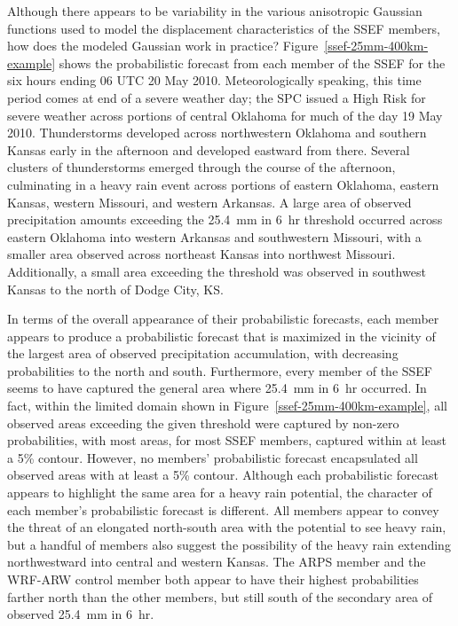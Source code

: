 Although there appears to be variability in the various anisotropic Gaussian functions used to model the displacement characteristics of the SSEF members, how does the modeled Gaussian work in practice?
\mbox{Figure \ref{ssef-25mm-400km-example}} shows the probabilistic forecast from each member of the SSEF for the six hours ending 06 UTC 20 May 2010.
Meteorologically speaking, this time period comes at end of a severe weather day; the SPC issued a High Risk for severe weather across portions of central Oklahoma for much of the day 19 May 2010.
Thunderstorms developed across northwestern Oklahoma and southern Kansas early in the afternoon and developed eastward from there.
Several clusters of thunderstorms emerged through the course of the afternoon, culminating in a heavy rain event across portions of eastern Oklahoma, eastern Kansas, western Missouri, and western Arkansas.
A large area of observed precipitation amounts exceeding the \mbox{25.4 mm} in \mbox{6 hr} threshold  occurred across eastern Oklahoma into western Arkansas and southwestern Missouri, with a smaller area observed across northeast Kansas into northwest Missouri.
Additionally, a small area exceeding the threshold was observed in southwest Kansas to the north of Dodge City, KS.


In terms of the overall appearance of their probabilistic forecasts, each member appears to produce a probabilistic forecast that is maximized in the vicinity of the largest area of observed precipitation accumulation, with decreasing probabilities to the north and south.
Furthermore, every member of the SSEF seems to have captured the general area where \mbox{25.4 mm} in \mbox{6 hr} occurred.
In fact, within the limited domain shown in \mbox{Figure \ref{ssef-25mm-400km-example}}, all observed areas exceeding the given threshold were captured by non-zero probabilities, with most areas, for most SSEF members, captured within at least a 5\% contour.
However, no members' probabilistic forecast encapsulated all observed areas with at least a 5\% contour.
Although each probabilistic forecast appears to highlight the same area for a heavy rain potential, the character of each member's probabilistic forecast is different.
All members appear to convey the threat of an elongated north-south area with the potential to see heavy rain, but a handful of members also suggest the possibility of the heavy rain extending northwestward into central and western Kansas.
The ARPS member and the WRF-ARW control member both appear to have their highest probabilities farther north than the other members, but still south of the secondary area of observed \mbox{25.4 mm} in \mbox{6 hr}.


